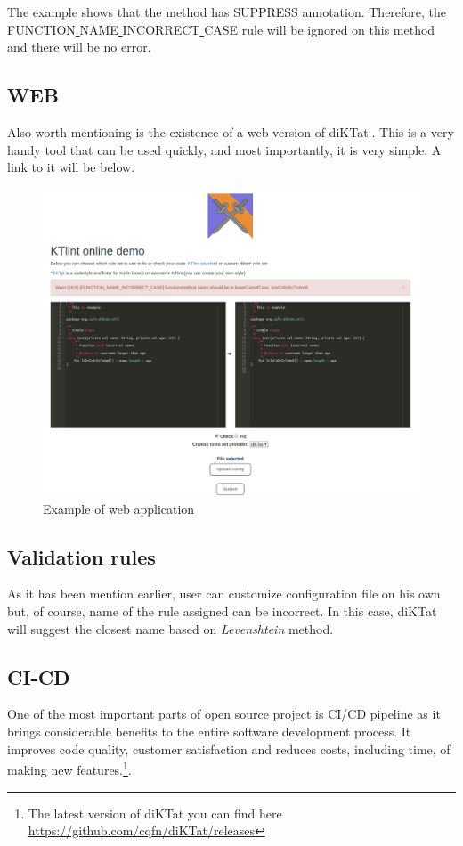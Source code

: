 The example shows that the method has SUPPRESS annotation. Therefore, the \\ FUNCTION\underline{ }NAME\underline{ }INCORRECT\underline{ }CASE rule will be ignored on this method and there will be no error.\\

\subsection{WEB}
\par
Also worth mentioning is the existence of a web version of diKTat.. This is a very handy tool that can be used quickly, and most importantly, it is very simple. A link to it will be below.
\begin{figure}[H]
  \centering
  \includegraphics[scale=0.3]{wp/pictures/web-example.png}
  \caption{Example of web application}   
\end{figure} 

\subsection{Validation rules}
\par
As it has been mention earlier, user can customize configuration file on his own but, of course, name of the rule assigned can be incorrect. In this case, diKTat will suggest the closest name based on \textsl{Levenshtein} method.

\subsection{CI-CD}
\par
One of the most important parts of open source project is CI/CD pipeline as it brings considerable benefits to the entire software development process. It improves code quality, customer satisfaction and reduces costs, including time, of making new features.\footnote{The latest version of diKTat you can find here \url{https://github.com/cqfn/diKTat/releases}}.